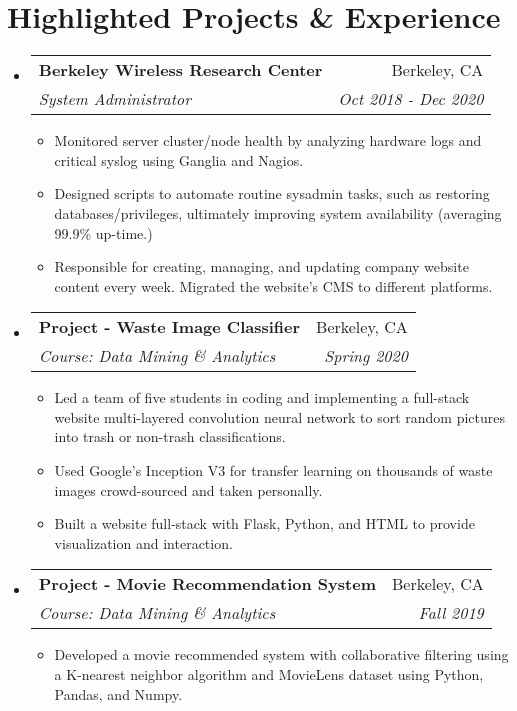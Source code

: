 \documentclass[letterpaper,11pt]{article}
\makeatletter
\newcommand{\resumeSubheading}[4]{
  \vspace{-1pt}\item
    \begin{tabular*}{0.97\textwidth}{l@{\extracolsep{\fill}}r}
      \textbf{#1} & #2 \\
      \textit{\small#3} & \textit{\small #4} \\
    \end{tabular*}\vspace{-5pt}
}
\newcommand{\resumeSubHeadingListStart}{\begin{itemize}[leftmargin=*]}
\newcommand{\resumeSubHeadingListEnd}{\end{itemize}}
\makeatother
\begin{document}
\section{Highlighted Projects \& Experience}
  \resumeSubHeadingListStart
    \resumeSubheading
      {Berkeley Wireless Research Center}{Berkeley, CA}
      {System Administrator}{Oct 2018 - Dec 2020}
      \begin{itemize}
        \item
          {Monitored server cluster/node health by analyzing hardware logs and critical syslog using Ganglia and Nagios.}
        \item
       	 {Designed scripts to automate routine sysadmin tasks, such as restoring databases/privileges, ultimately improving system availability (averaging 99.9\% up-time.)}
        \item
          {Responsible for creating, managing, and updating company website content every week. Migrated the website's CMS to different platforms.}
      \end{itemize}

    \resumeSubheading
		{Project - Waste Image Classifier}{Berkeley, CA}
		{Course: Data Mining \& Analytics}{Spring 2020}
		\begin{itemize}
			\item	{Led a team of five students in coding and implementing a full-stack website multi-layered convolution neural network to sort random pictures into trash or non-trash classifications.}
			\item	{Used Google's Inception V3 for transfer learning on thousands of waste images crowd-sourced and taken personally.}
			\item {Built a website full-stack with Flask, Python, and HTML to provide visualization and interaction.}
		\end{itemize}
	\resumeSubheading
	{Project - Movie Recommendation System}{Berkeley, CA}
	{Course: Data Mining \& Analytics}{Fall 2019}
	\begin{itemize}
		\item	{Developed a movie recommended system with collaborative filtering using a K-nearest neighbor algorithm and MovieLens dataset using Python, Pandas, and Numpy.}
	\end{itemize}
  \resumeSubHeadingListEnd


\end{document}
